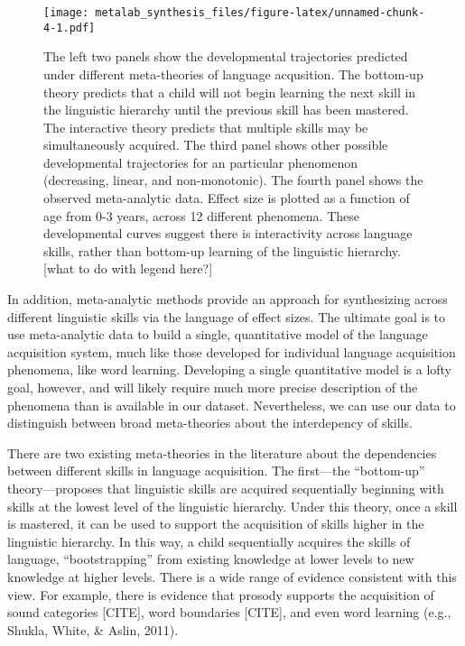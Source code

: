 \documentclass[english,floatsintext,man]{apa6}
\begin{document}
\begin{figure}[htbp]
\centering
\texttt{[image: metalab\_synthesis\_files/figure-latex/unnamed-chunk-4-1.pdf]}
\caption{The left two panels show the developmental trajectories
predicted under different meta-theories of language acqusition. The
bottom-up theory predicts that a child will not begin learning the next
skill in the linguistic hierarchy until the previous skill has been
mastered. The interactive theory predicts that multiple skills may be
simultaneously acquired. The third panel shows other possible
developmental trajectories for an particular phenomenon (decreasing,
linear, and non-monotonic). The fourth panel shows the observed
meta-analytic data. Effect size is plotted as a function of age from 0-3
years, across 12 different phenomena. These developmental curves suggest
there is interactivity across language skills, rather than bottom-up
learning of the linguistic hierarchy. {[}what to do with legend
here?{]}}
\end{figure}

In addition, meta-analytic methods provide an approach for synthesizing
across different linguistic skills via the language of effect sizes. The
ultimate goal is to use meta-analytic data to build a single,
quantitative model of the language acquisition system, much like those
developed for individual language acquisition phenomena, like word
learning. Developing a single quantitative model is a lofty goal,
however, and will likely require much more precise description of the
phenomena than is available in our dataset. Nevertheless, we can use our
data to distinguish between broad meta-theories about the interdepency
of skills.

There are two existing meta-theories in the literature about the
dependencies between different skills in language acquisition. The
first---the \enquote{bottom-up} theory---proposes that linguistic skills
are acquired sequentially beginning with skills at the lowest level of
the linguistic hierarchy. Under this theory, once a skill is mastered,
it can be used to support the acquisition of skills higher in the
linguistic hierarchy. In this way, a child sequentially acquires the
skills of language, \enquote{bootstrapping} from existing knowledge at
lower levels to new knowledge at higher levels. There is a wide range of
evidence consistent with this view. For example, there is evidence that
prosody supports the acquisition of sound categories {[}CITE{]}, word
boundaries {[}CITE{]}, and even word learning (e.g., Shukla, White, \&
Aslin, 2011).
\end{document}
